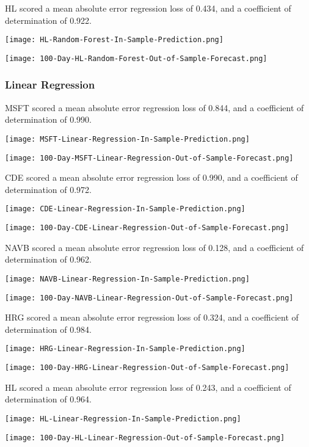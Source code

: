 HL scored a mean absolute error regression loss of 0.434, and a coefficient of determination of 0.922.

\texttt{[image: HL-Random-Forest-In-Sample-Prediction.png]}

\texttt{[image: 100-Day-HL-Random-Forest-Out-of-Sample-Forecast.png]}

\subsubsection{Linear Regression}
MSFT scored a mean absolute error regression loss of 0.844, and a coefficient of determination of 0.990.

\texttt{[image: MSFT-Linear-Regression-In-Sample-Prediction.png]}

\texttt{[image: 100-Day-MSFT-Linear-Regression-Out-of-Sample-Forecast.png]}

CDE scored a mean absolute error regression loss of 0.990, and a coefficient of determination of 0.972.

\texttt{[image: CDE-Linear-Regression-In-Sample-Prediction.png]}

\texttt{[image: 100-Day-CDE-Linear-Regression-Out-of-Sample-Forecast.png]}

NAVB scored a mean absolute error regression loss of 0.128, and a coefficient of determination of 0.962.

\texttt{[image: NAVB-Linear-Regression-In-Sample-Prediction.png]}

\texttt{[image: 100-Day-NAVB-Linear-Regression-Out-of-Sample-Forecast.png]}

HRG scored a mean absolute error regression loss of 0.324, and a coefficient of determination of 0.984.

\texttt{[image: HRG-Linear-Regression-In-Sample-Prediction.png]}

\texttt{[image: 100-Day-HRG-Linear-Regression-Out-of-Sample-Forecast.png]}

HL scored a mean absolute error regression loss of 0.243, and a coefficient of determination of 0.964.

\texttt{[image: HL-Linear-Regression-In-Sample-Prediction.png]}

\texttt{[image: 100-Day-HL-Linear-Regression-Out-of-Sample-Forecast.png]}

